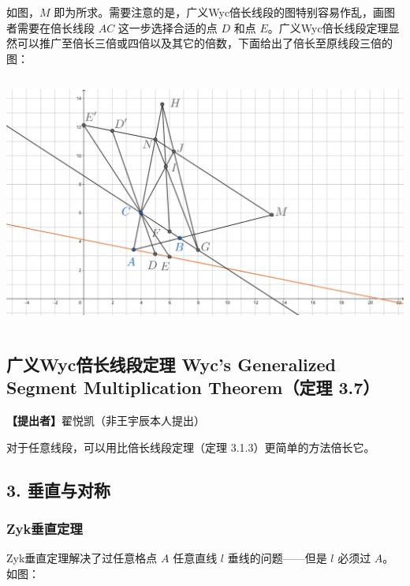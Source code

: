 \documentclass[UTF8]{article}
\begin{document}
如图，\(M\)
即为所求。需要注意的是，广义Wyc倍长线段的图特别容易作乱，画图者需要在倍长线段
\(AC\) 这一步选择合适的点 \(D\) 和点
\(E\)。广义Wyc倍长线段定理显然可以推广至倍长三倍或四倍以及其它的倍数，下面给出了倍长至原线段三倍的图：

\includegraphics[width=5.76806in,height=3.27847in]{media/image43.png}

\hypertarget{ux5e7fux4e49wycux500dux957fux7ebfux6bb5ux5b9aux7406-wycs-generalized-segment-multiplication-theoremux5b9aux7406-3.7}{%
\subsection{广义Wyc倍长线段定理 Wyc's Generalized Segment Multiplication
Theorem（定理
3.7）}\label{ux5e7fux4e49wycux500dux957fux7ebfux6bb5ux5b9aux7406-wycs-generalized-segment-multiplication-theoremux5b9aux7406-3.7}}

\textbf{【提出者】}翟悦凯（非王宇辰本人提出）

对于任意线段，可以用比倍长线段定理（定理 3.1.3）更简单的方法倍长它。

\hypertarget{ux5782ux76f4ux4e0eux5bf9ux79f0}{%
\subsection{3. 垂直与对称}\label{ux5782ux76f4ux4e0eux5bf9ux79f0}}

\hypertarget{zykux5782ux76f4ux5b9aux7406}{%
\subsubsection{Zyk垂直定理}\label{zykux5782ux76f4ux5b9aux7406}}

Zyk垂直定理解决了过任意格点 \(A\) 任意直线 \(l\) 垂线的问题------但是
\(l\) 必须过 \(A\)。如图：
\end{document}

